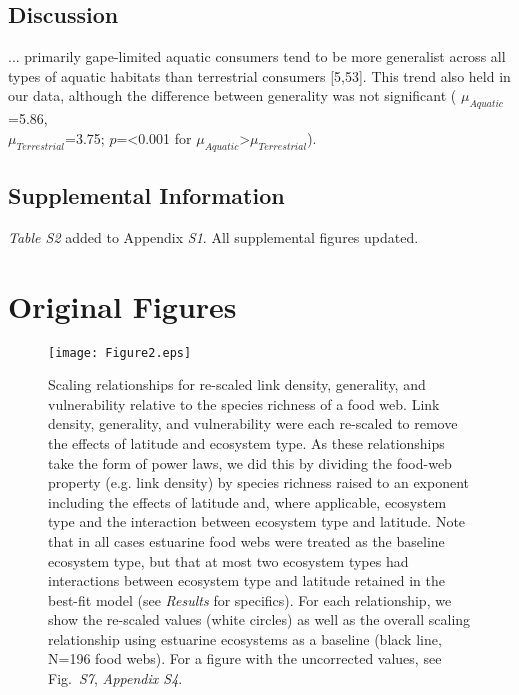 \documentclass[12pt]{article}
\begin{document}
\begin{spacing}{2.0}
  \subsection*{Discussion}

    ... primarily gape-limited aquatic consumers tend to be more
    generalist across all types of aquatic habitats than terrestrial 
    consumers [5,53]. This trend also held in our data, although the difference between generality was not significant (
    $\mu_{Aquatic}$=5.86, \\$\mu_{Terrestrial}$=3.75; $p$=\textless0.001 for $\mu_{Aquatic}$\textgreater$\mu_{Terrestrial}$). 

  \subsection*{Supplemental Information}

    \emph{Table S2} added to Appendix \emph{S1}. All supplemental figures updated.


% 
% 

\clearpage

\section*{Original Figures}

\setcounter{figure}{1}

\begin{figure}[h]
\texttt{[image: Figure2.eps]}
\caption{
Scaling relationships for re-scaled link density, generality, and vulnerability 
relative to the species richness of a food web. Link density, generality,
and vulnerability were each re-scaled to remove the effects of latitude and ecosystem
type. As these relationships take the form of power laws, we did this by dividing the food-web
property (e.g. link density) by species richness raised to an exponent including the 
effects of latitude and, where applicable, ecosystem type and the interaction between ecosystem
type and latitude. Note that in all cases estuarine food webs were treated as the baseline 
ecosystem type, but that at most two ecosystem types had interactions between ecosystem type and
latitude retained in the best-fit model (see \emph{Results} for specifics). For each relationship, 
we show the re-scaled values (white circles) as well as the overall scaling relationship using estuarine
ecosystems as a baseline (black line, N=196 food webs). For a figure with the uncorrected values,
see Fig.~\emph{S7}, \emph{Appendix S4}.}
\label{props_v_lat1}
\end{figure}



\end{spacing}
\end{document}

